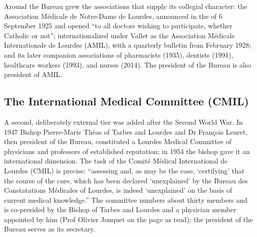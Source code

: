 Around the Bureau grew the associations that supply its collegial
character: the Association M\'edicale de Notre-Dame de Lourdes,
announced in the  of 6 September 1925
and opened ``to all doctors wishing to participate, whether
Catholic or not''; internationalized under Vallet as the
Association M\'edicale Internationale de Lourdes (AMIL), with a
quarterly bulletin from February 1928; and its later companion
associations of pharmacists (1935), dentists (1991), healthcare
workers (1993), and nurses (2014). The president of the Bureau is
also president of AMIL.

\subsection{The International Medical Committee (CMIL)}

A second, deliberately external tier was added after the Second
World War. In 1947 Bishop Pierre-Marie Th\'eas of Tarbes and
Lourdes and Dr Fran\c{c}ois Leuret, then president of the Bureau,
constituted a Lourdes Medical Committee of physicians and
professors of established reputation; in 1954 the bishop gave it
an international dimension. The task of the Comit\'e M\'edical
International de Lourdes (CMIL) is precise: ``assessing and, as
may be the case, `certifying' that the course of the cure, which
has been declared `unexplained' by the Bureau des Constatations
M\'edicales of Lourdes, is indeed `unexplained' on the basis of
current medical knowledge.'' The committee numbers about thirty
members and is co-presided by the Bishop of Tarbes and Lourdes
and a physician member appointed by him (Prof Olivier Jonquet on
the page as read); the president of the Bureau serves as its
secretary.

